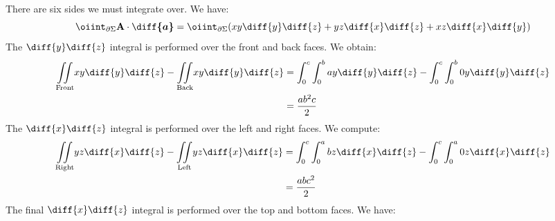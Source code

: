             \begin{solution}
                There are six sides we must integrate over.
                We have:
                \begin{equation}
                    \oiint_{\partial\Sigma}
                        \mathbf{A}\cdot\boldsymbol{\diff{a}}
                    =\oiint_{\partial\Sigma}(xy\diff{y}\diff{z}
                                             +yz\diff{x}\diff{z}
                                             +xz\diff{x}\diff{y})
                \end{equation}
                The $\diff{y}\diff{z}$ integral is performed over
                the front and back faces. We obtain:
                \begin{subequations}
                    \begin{align}
                        \underset{\textrm{Front}}{\iint}
                            xy\diff{y}\diff{z}-
                        \underset{\textrm{Back}}{\iint}
                            xy\diff{y}\diff{z}
                        &=\int_{0}^{c}\int_{0}^{b}ay\diff{y}\diff{z}
                            -\int_{0}^{c}\int_{0}^{b}
                            0y\diff{y}\diff{z}\\
                        &=\frac{ab^{2}c}{2}
                    \end{align}
                \end{subequations}
                The $\diff{x}\diff{z}$ integral is performed over
                the left and right faces. We compute:
                \begin{subequations}
                    \begin{align}
                        \underset{\textrm{Right}}{\iint}
                            yz\diff{x}\diff{z}-
                        \underset{\textrm{Left}}{\iint}
                            yz\diff{x}\diff{z}
                        &=\int_{0}^{c}\int_{0}^{a}bz\diff{x}\diff{z}-
                          \int_{0}^{c}\int_{0}^{a}0z\diff{x}\diff{z}\\
                        &=\frac{abc^{2}}{2}
                    \end{align}
                \end{subequations}
                The final $\diff{x}\diff{z}$ integral is performed
                over the top and bottom faces. We have:
                \begin{subequations}
                    \begin{align}

\end{align}
\end{subequations}
\end{solution}
